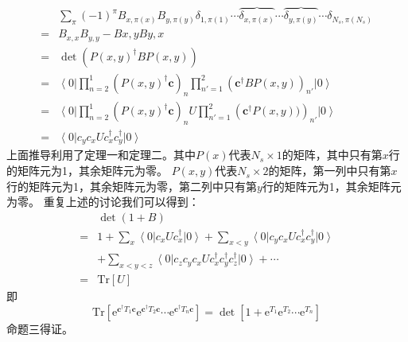\documentclass[UTF8,cs4size]{ctexart}
\def\ee{\mathrm e}
\begin{document}
\[
    \begin{aligned}
        &\sum_{\pi} (-1)^{\pi}  B_{x,\pi(x)}  B_{y,\pi(y)} \delta_{1,\pi(1)}   \cdots  
        \overbrace{\delta_{x,\pi(x)}} \cdots \overbrace{\delta_{y,\pi(y)}} \cdots
        \delta_{N_s,\pi(N_s)}\\
        =&B_{x,x}B_{y,y}-B{x,y}B{y,x}\\
        =&\det\left(P(x,y)^{\dag}BP(x,y)\right)\\
        =&\left< 0 \right| \prod_{n=2}^{1}\left(P(x,y)^{\dag} \mathbf{c}\right)_n 
        \prod_{n'=1}^{2}\left(\mathbf{c^{\dag}}B P(x,y)\right)_{n'} \left| 0 \right>\\
        =&\left< 0 \right| \prod_{n=2}^{1} \left(P(x,y)^{\dag} \mathbf{c}\right)_{n} U 
        \prod_{n'=1}^{2}\left(\mathbf{c^{\dag}} P(x,y))\right)_{n'} \left| 0 \right>\\
        =&\left< 0 \right| c_{y} c_{x} U c^{\dag}_{x} c^{\dag}_{y} \left| 0 \right>
    \end{aligned}    
\]
上面推导利用了定理一和定理二。其中$P(x)$代表$N_s\times 1$的矩阵，其中只有第$x$行的矩阵元为1，其余矩阵元为零。
$P(x,y)$代表$N_s\times 2$的矩阵，第一列中只有第$x$行的矩阵元为1，其余矩阵元为零，第二列中只有第$y$行的矩阵元为1，其余矩阵元为零。
重复上述的讨论我们可以得到：
\[
    \begin{aligned}
        &\det(1+B)\\
        =&1+\sum_{x} \left< 0 \right| c_{x} U c^{\dag}_{x} \left| 0 \right>
        +\sum_{x<y} \left< 0 \right| c_{y} c_{x} U c^{\dag}_{x} c^{\dag}_{y} \left| 0 \right>\\
        &+\sum_{x<y<z} \left< 0 \right| c_{z} c_{y} c_{x} U c^{\dag}_{x} c^{\dag}_{y} c^{\dag}_{z} \left| 0 \right>
        +\cdots\\
        =&\mathrm{Tr}[U]
    \end{aligned}    
\]
即
\[
    \mathrm{Tr} \left[ \ee^{\mathbf{c^{\dag}} T_1 \mathbf{c}} 
    \ee^{\mathbf{c^{\dag}} T_2 \mathbf{c}} \cdots \ee^{\mathbf{c^{\dag}} T_n \mathbf{c}} \right]
    = \det \left[ 1+ \ee^{T_1} \ee^{T_2} \cdots \ee^{T_n}\right] 
\]
命题三得证。
\iffalse
\end{document}

